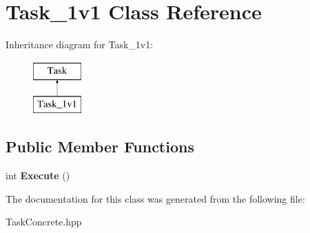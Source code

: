 \hypertarget{classTask__1v1}{\section{\-Task\-\_\-1v1 \-Class \-Reference}
\label{classTask__1v1}
}
\-Inheritance diagram for \-Task\-\_\-1v1\-:\begin{figure}[H]
\begin{center}
\leavevmode
\includegraphics[height=2.000000cm]{classTask__1v1}
\end{center}
\end{figure}
\subsection*{\-Public \-Member \-Functions}
\begin{DoxyCompactItemize}
\item 
\hypertarget{classTask__1v1_a73cfe1c909a363180dbdeaeaa6ba1c7c}{int {\bfseries \-Execute} ()}\label{classTask__1v1_a73cfe1c909a363180dbdeaeaa6ba1c7c}

\end{DoxyCompactItemize}


\-The documentation for this class was generated from the following file\-:\begin{DoxyCompactItemize}
\item 
\-Task\-Concrete.\-hpp\end{DoxyCompactItemize}
